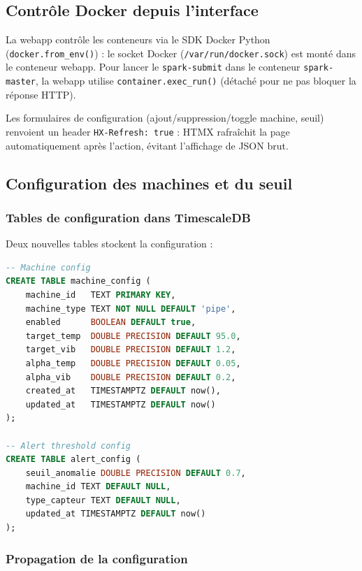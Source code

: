\documentclass[12pt,a4paper]{article}
\begin{document}
\subsection{Contrôle Docker depuis l'interface}

La webapp contrôle les conteneurs via le SDK Docker Python (\texttt{docker.from\_env()}) : le socket Docker (\texttt{/var/run/docker.sock}) est monté dans le conteneur webapp. Pour lancer le \texttt{spark-submit} dans le conteneur \texttt{spark-master}, la webapp utilise \texttt{container.exec\_run()} (détaché pour ne pas bloquer la réponse HTTP).

Les formulaires de configuration (ajout/suppression/toggle machine, seuil) renvoient un header \texttt{HX-Refresh: true} : HTMX rafraîchit la page automatiquement après l'action, évitant l'affichage de JSON brut.

\subsection{Configuration des machines et du seuil}

\subsubsection{Tables de configuration dans TimescaleDB}

Deux nouvelles tables stockent la configuration :

\begin{lstlisting}[language=SQL,caption={Tables de configuration}]
-- Machine config
CREATE TABLE machine_config (
    machine_id   TEXT PRIMARY KEY,
    machine_type TEXT NOT NULL DEFAULT 'pipe',
    enabled      BOOLEAN DEFAULT true,
    target_temp  DOUBLE PRECISION DEFAULT 95.0,
    target_vib   DOUBLE PRECISION DEFAULT 1.2,
    alpha_temp   DOUBLE PRECISION DEFAULT 0.05,
    alpha_vib    DOUBLE PRECISION DEFAULT 0.2,
    created_at   TIMESTAMPTZ DEFAULT now(),
    updated_at   TIMESTAMPTZ DEFAULT now()
);

-- Alert threshold config
CREATE TABLE alert_config (
    seuil_anomalie DOUBLE PRECISION DEFAULT 0.7,
    machine_id TEXT DEFAULT NULL,
    type_capteur TEXT DEFAULT NULL,
    updated_at TIMESTAMPTZ DEFAULT now()
);
\end{lstlisting}

\subsubsection{Propagation de la configuration}
\end{document}
